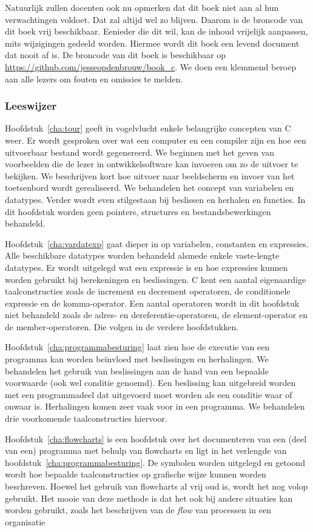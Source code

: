 Natuurlijk zullen docenten ook nu opmerken dat dit boek niet aan al hun
verwachtingen voldoet. Dat zal altijd wel zo blijven. Daarom is de broncode
van dit boek vrij beschikbaar. Eenieder die dit wil, kan de inhoud
vrijelijk aanpassen, mits wijzigingen gedeeld
worden. Hiermee wordt dit boek een levend document dat nooit af is.
De broncode
van dit boek is beschikbaar op \url{https://github.com/jesseopdenbrouw/book_c}. We doen
een klemmend beroep aan alle lezers om fouten en omissies te melden.

\subsubsection*{Leeswijzer}
Hoofdstuk~\ref{cha:tour} geeft in vogelvlucht enkele belangrijke concepten van  C weer. Er wordt gesproken over wat een computer en een compiler zijn en hoe een uitvoerbaar bestand wordt gegenereerd. We beginnen met het geven van voorbeelden die de lezer in ontwikkelsoftware kan invoeren om zo de uitvoer te bekijken. We beschrijven kort hoe uitvoer naar beeldscherm en invoer van het toetsenbord wordt gerealiseerd. We behandelen het concept van variabelen en datatypes. Verder wordt even stilgestaan bij beslissen en herhalen en functies. In dit hoofdstuk worden geen pointers, structures en bestandsbewerkingen behandeld.

Hoofdstuk~\ref{cha:vardatexp} gaat dieper in op variabelen, constanten en expressies. Alle beschikbare datatypes worden behandeld alsmede enkele vaste-lengte datatypes. Er wordt uitgelegd wat een expressie is en hoe expressies kunnen worden gebruikt bij berekeningen en beslissingen. C kent een aantal eigenaardige taalconstructies zoals de increment en decrement operatoren, de conditionele expressie en de komma-operator. Een aantal operatoren wordt in dit hoofdstuk niet behandeld zoals de adres- en dereferentie-operatoren, de element-operator en de member-operatoren. Die volgen in de verdere hoofdstukken.

Hoofdstuk~\ref{cha:programmabesturing} laat zien hoe de executie van een programma kan worden beïnvloed met beslissingen en herhalingen. We behandelen het gebruik van beslissingen aan de hand van een bepaalde voorwaarde (ook wel conditie genoemd). Een beslissing kan uitgebreid worden met een programmadeel dat uitgevoerd moet worden als een conditie waar of onwaar is. Herhalingen komen zeer vaak voor in een programma. We behandelen drie voorkomende taalconstructies hiervoor.

Hoofdstuk~\ref{cha:flowcharts} is een hoofdstuk over het documenteren van een (deel van een) programma met behulp van flowcharts en ligt in het verlengde van hoofdstuk~\ref{cha:programmabesturing}. De symbolen worden uitgelegd en
getoond wordt hoe bepaalde taalconstructies op grafische wijze kunnen worden beschreven. Hoewel het gebruik van flowcharts al vrij oud is, wordt het nog volop gebruikt. Het mooie van deze methode is dat het ook bij andere situaties kan worden gebruikt, zoals het beschrijven van de \textsl{flow} van processen in een organisatie

